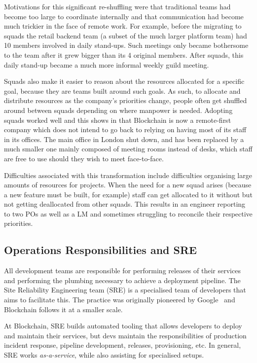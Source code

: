 \documentclass[conference]{IEEEtran}
\begin{document}
    Motivations for this significant re-shuffling were that traditional teams had become too large to coordinate internally and that communication had become much trickier in the face of remote work.
    For example, before the migrating to squads the retail backend team (a subset of the much larger platform team) had 10 members involved in daily stand-ups.
    Such meetings only became bothersome to the team after it grew bigger than its 4 original members.
    After squads, this daily stand-up became a much more informal weekly guild meeting.

    Squads also make it easier to reason about the resources allocated for a specific goal, because they are teams built around such goals.
    As such, to allocate and distribute resources as the company's priorities change, people often get shuffled around between squads depending on where manpower is needed.
    Adopting squads worked well and this shows in that Blockchain is now a remote-first company which does not intend to go back to relying on having most of its staff in its offices.
    The main office in London shut down, and has been replaced by a much smaller one mainly composed of meeting rooms instead of desks, which staff are free to use should they wish to meet face-to-face.

    Difficulties associated with this transformation include difficulties organising large amounts of resources for projects.
    When the need for a new squad arises (because a new feature must be built, for example) staff can get allocated to it without but not getting deallocated from other squads.
    This results in an engineer reporting to two POs as well as a LM and sometimes struggling to reconcile their respective priorities.

    \subsection{Operations Responsibilities and SRE}

    All development teams are responsible for performing releases of their services and performing the plumbing necessary to achieve a deployment pipeline.
    The Site Reliability Engineering team (SRE) is a specialised team of developers that aims to facilitate this.
    The practice was originally pioneered by Google~\cite{googleSreIntro} and Blockchain follows it at a smaller scale.

    At Blockchain, SRE builds automated tooling that allows developers to deploy and maintain their services, but devs maintain the responsibilities of production incident response, pipeline development, releases, provisioning, etc.
    In general, SRE works \emph{as-a-service}, while also assisting for specialised setups.
\end{document}
